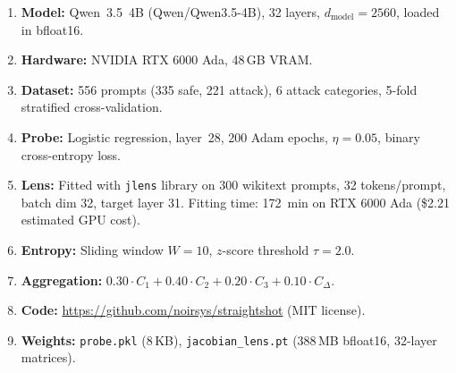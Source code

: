 \documentclass[11pt]{article}
\begin{document}
\begin{enumerate}[nosep]
    \item \textbf{Model:} Qwen~3.5~4B (Qwen/Qwen3.5-4B), 32 layers, $d_{\text{model}}=2560$, loaded in bfloat16.
    \item \textbf{Hardware:} NVIDIA RTX 6000 Ada, 48\,GB VRAM.
    \item \textbf{Dataset:} 556 prompts (335 safe, 221 attack), 6 attack categories, 5-fold stratified cross-validation.
    \item \textbf{Probe:} Logistic regression, layer~28, 200 Adam epochs, $\eta=0.05$, binary cross-entropy loss.
    \item \textbf{Lens:} Fitted with \texttt{jlens} library on 300 wikitext prompts, 32 tokens/prompt, batch dim 32, target layer 31. Fitting time: 172~min on RTX 6000 Ada (\$2.21 estimated GPU cost).
    \item \textbf{Entropy:} Sliding window $W=10$, $z$-score threshold $\tau=2.0$.
    \item \textbf{Aggregation:} $0.30 \cdot C_1 + 0.40 \cdot C_2 + 0.20 \cdot C_3 + 0.10 \cdot C_{\Delta}$.
    \item \textbf{Code:} \url{https://github.com/noirsys/straightshot} (MIT license).
    \item \textbf{Weights:} \texttt{probe.pkl} (8\,KB), \texttt{jacobian\_lens.pt} (388\,MB bfloat16, 32-layer matrices).
\end{enumerate}
\end{document}
